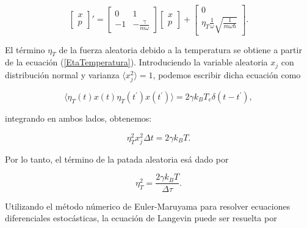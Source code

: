 \documentclass[letterpaper,12pt,oneside]{book}
\begin{document}
	\begin{equation}
		\begin{bmatrix}
		x \\ p
		\end{bmatrix}' = 
		\begin{bmatrix}
		0 & 1 \\
		-1 & -\frac{\gamma}{m\omega}
		\end{bmatrix}
		\begin{bmatrix}
		x \\ p
		\end{bmatrix} 
		+
		\begin{bmatrix}
		0 \\ \eta_T\frac{1}{\omega}\sqrt{\frac{1}{m\omega\hbar}}
		\end{bmatrix}.
	\end{equation}
	
	
	
	 El t\'ermino $\eta_T$ de la fuerza aleatoria debido a la temperatura se obtiene a partir de la ecuaci\'on (\ref{EtaTemperatura}). Introduciendo la variable aleatoria $x_j$ con distribuci\'on normal y varianza $\langle x_j^2 \rangle = 1$, podemos escribir dicha ecuaci\'on como
	
	\begin{equation}
		\langle \eta_T(t)x(t)\eta_T(t^{'})x(t^{'}) \rangle = 2\gamma k_BT_e\delta(t-t^{'
		}),
	\end{equation}
	
	\noindent integrando en ambos lados, obtenemos:
	
	\begin{equation}
		\eta_T^2x_j^2\Delta t = 2\gamma k_B T.
	\end{equation}
	
	Por lo tanto, el t\'ermino de la patada aleatoria es\'a dado por
	
	\begin{equation}\label{EtaTemperaturaCalculado}
		\eta_T^2 = \frac{2\gamma k_BT}{\Delta \tau}.
	\end{equation}
	
	Utilizando el m\'etodo n\'umerico de Euler-Maruyama para resolver ecuaciones diferenciales estoc\'asticas, la ecuaci\'on de Langevin puede ser resuelta por
	
\end{document}
